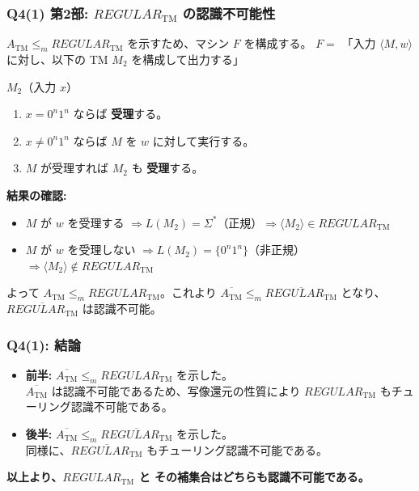 \begin{frame}[fragile]
\frametitle{Q4(1) 第2部: $REGULAR_{\text{TM}}$ の認識不可能性}

$A_{\text{TM}} \le_m REGULAR_{\text{TM}}$ を示すため、マシン $F$ を構成する。
$F = $ 「入力 $\langle M, w \rangle$ に対し、以下の TM $M_2$ を構成して出力する」
\begin{block}{$M_2$（入力 $x$）}
    \begin{enumerate}
        \item $x = 0^n 1^n$ ならば \textbf{受理}する。
        \item $x \neq 0^n 1^n$ ならば $M$ を $w$ に対して実行する。
        \item $M$ が受理すれば $M_2$ も \textbf{受理}する。
    \end{enumerate}
\end{block}

\textbf{結果の確認:}
\begin{itemize}
    \item $M$ が $w$ を受理する $\Rightarrow L(M_2) = \Sigma^*$（正規）$\Rightarrow \langle M_2 \rangle \in REGULAR_{\text{TM}}$
    \item $M$ が $w$ を受理しない $\Rightarrow L(M_2) = \{0^n 1^n\}$（非正規）$\Rightarrow \langle M_2 \rangle \notin REGULAR_{\text{TM}}$
\end{itemize}
よって $A_{\text{TM}} \le_m REGULAR_{\text{TM}}$。これより $\overline{A_{\text{TM}}} \le_m \overline{REGULAR_{\text{TM}}}$ となり、$\overline{REGULAR_{\text{TM}}}$ は認識不可能。
\end{frame}

\begin{frame}[fragile]
\frametitle{Q4(1): 結論}

\begin{itemize}
    \item \textbf{前半:} $\overline{A_{\text{TM}}} \le_m REGULAR_{\text{TM}}$ を示した。\\
    $\overline{A_{\text{TM}}}$ は認識不可能であるため、写像還元の性質により $REGULAR_{\text{TM}}$ もチューリング認識不可能である。
    \vspace{1em}
    \item \textbf{後半:} $\overline{A_{\text{TM}}} \le_m \overline{REGULAR_{\text{TM}}}$ を示した。\\
    同様に、$\overline{REGULAR_{\text{TM}}}$ もチューリング認識不可能である。
\end{itemize}

\begin{center}
    \textbf{以上より、$REGULAR_{\text{TM}}$ と その補集合はどちらも認識不可能である。}
\end{center}
\end{frame}